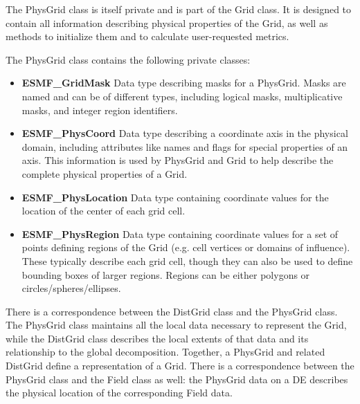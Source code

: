%



The PhysGrid class is itself private and is part of the Grid
class.  It is designed to contain all information describing physical
properties of the Grid, as well as methods to initialize them and to
calculate user-requested metrics.

The PhysGrid class contains the following private classes:
\begin{itemize}

\item {\bf ESMF\_GridMask} Data type describing masks for a PhysGrid.  Masks
are named and can be of different types, including logical masks,
multiplicative masks, and integer region identifiers.

\item {\bf ESMF\_PhysCoord} Data type describing a coordinate axis in the
physical domain, including attributes like names and flags for special
properties of an axis.  This information is used by PhysGrid and Grid
to help describe the complete physical properties of a Grid.

\item {\bf ESMF\_PhysLocation} Data type containing coordinate values for 
the location of the center of each grid cell.

\item {\bf ESMF\_PhysRegion} Data type containing coordinate values for a set
of points defining regions of the Grid (e.g. cell vertices or domains of
influence).  These typically describe each grid cell, though they can also be
used to define bounding boxes of larger regions.  Regions can be either
polygons or circles/spheres/ellipses.

\end{itemize}






There is a correspondence between the DistGrid class and the PhysGrid
class.  The PhysGrid class maintains all the local data necessary to
represent the Grid, while the DistGrid class describes the local extents
of that data and its relationship to the global decomposition.
Together, a PhysGrid and related DistGrid define a representation of
a Grid.  There is a correspondence between the PhysGrid class and the Field
class as well:  the PhysGrid data on a DE describes the physical location
of the corresponding Field data.

